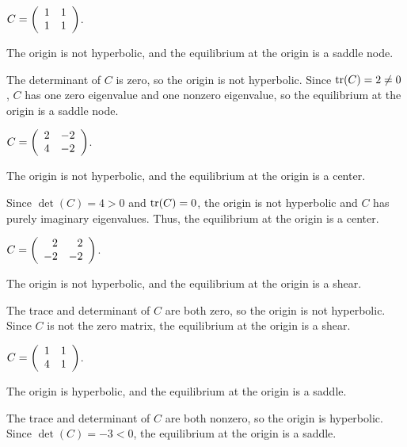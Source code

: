 \documentclass{ximera}
\begin{document}
\begin{exercise}  \label{E:PQd}
$C = \left(\begin{array}{rr} 1 & 1\\ 1 &1\end{array}\right)$.

\begin{solution}
\ans The origin is not hyperbolic, and the equilibrium at
the origin is a saddle node.

\soln The determinant of $C$ is zero, so the origin is not hyperbolic.
Since ${\rm tr}(C) = 2 \neq 0$, $C$ has one zero eigenvalue and one
nonzero eigenvalue, so the equilibrium at the origin is a saddle node.

\end{solution}
\end{exercise}
\begin{exercise}  \label{E:PQe}
$C = \left(\begin{array}{rr} 2 & -2\\ 4 &-2\end{array}\right)$.

\begin{solution}
\ans The origin is not hyperbolic, and the equilibrium at
the origin is a center.

\soln Since $\det(C) = 4 > 0$ and ${\rm tr}(C) = 0$, the origin is not
hyperbolic and $C$ has purely imaginary eigenvalues.  Thus, the
equilibrium at the origin is a center.

\end{solution}
\end{exercise}
\begin{exercise}  \label{E:PQf}
$C = \left(\begin{array}{rr} 2 & 2\\ -2 &-2\end{array}\right)$.

\begin{solution}
\ans The origin is not hyperbolic, and the equilibrium at
the origin is a shear.

\soln The trace and determinant of $C$ are both zero, so the origin
is not hyperbolic.  Since $C$ is not the zero matrix, the equilibrium
at the origin is a shear.

\end{solution}
\end{exercise}
\begin{exercise}  \label{E:PQg}
$C = \left(\begin{array}{rr} 1 & 1\\ 4 &1\end{array}\right)$.

\begin{solution}
\ans The origin is hyperbolic, and the equilibrium at the origin
is a saddle.

\soln The trace and determinant of $C$ are both nonzero, so the origin
is hyperbolic.  Since $\det(C) = -3 < 0$, the equilibrium at the origin 
is a saddle.

\end{solution}
\end{exercise}
\end{document}
